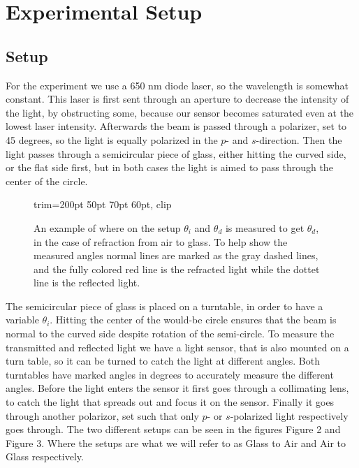 \chapter{Experimental Setup}
\section{Setup}
%

For the experiment we use a 650 nm diode laser\autocite{pasco_os8525a_manual}, so the wavelength is somewhat constant. 
This laser is first sent through an aperture to decrease the intensity of the light, by \mbox{obstructing} some, because our sensor becomes saturated even at the lowest laser intensity.
Afterwards the beam is passed through a polarizer, set to 45 degrees, so the light is equally polarized in the $p$- and $s$-direction.
Then the light passes through a semicircular piece of glass, either hitting the curved side, or the flat side first, but in both cases the light is aimed to pass through the center of the circle.
%
\begin{figure}[h]
    \begin{adjustbox}{trim=200pt 50pt 70pt 60pt, clip} %
    
    \end{adjustbox}
    \centering
    \caption{An example of where on the setup $\theta_i$ and $\theta_d$ is measured to get $\theta_d$, in the case of refraction from air to glass. To help show the measured angles normal lines are marked as the gray dashed lines, and the fully colored red line is the refracted light while the dottet line is the reflected light.}
    \label{fig:Thetad}
\end{figure} %
%
The semicircular piece of glass is placed on a turntable, in order to have a variable $\theta_i$. 
Hitting the center of the would-be circle ensures that the beam is normal to the curved side despite rotation of the semi-circle.
%
To measure the transmitted and reflected light we have a light sensor\autocite{pasco_ci6604_manual}, that is also mounted on a turn table, so it can be turned to catch the light at different angles.
Both turntables have marked angles in degrees to accurately measure the different angles. 
%
Before the light enters the sensor it first goes through a collimating lens, to catch the light that spreads out and focus it on the sensor. 
Finally it goes through another polarizor, set such that only $p$- or $s$-polarized light respectively goes through. The two different setups can be seen in the figures Figure 2 and Figure 3. Where the setups are what we will refer to as Glass to Air and Air to Glass respectively.
%
